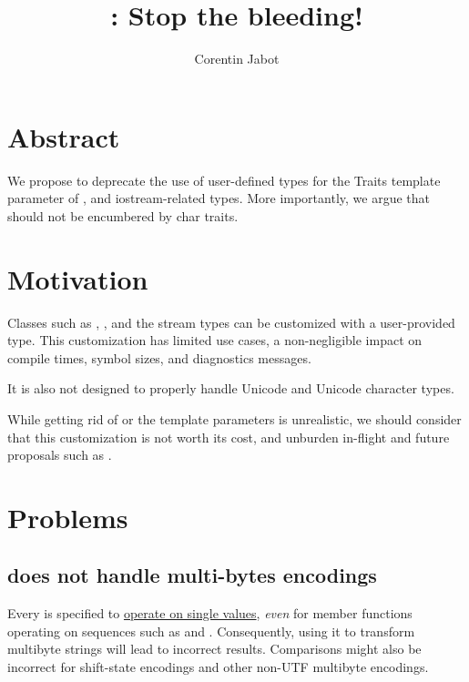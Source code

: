 \documentclass{wg21}
\title{\tcode{char\_traits}: Stop the bleeding!}
\author{Corentin Jabot}{corentin.jabot@gmail.com}
\begin{document}
\maketitle

\section{Abstract}

We propose to deprecate the use of user-defined types for the Traits template parameter of ,  
and iostream-related types. More importantly, we argue that  should not be encumbered by char traits.


\section{Motivation}

Classes such as , , and the stream types can be customized with a user-provided  type.
This customization has limited use cases, a non-negligible impact on compile times, symbol sizes, and diagnostics messages.

It is also not designed to properly handle Unicode and Unicode character types.

While getting rid of  or the  template parameters is unrealistic, we should consider that this customization
is not worth its cost, and unburden in-flight and future proposals such as  .

\section{Problems}

\subsection{ does not handle multi-bytes encodings}

Every   is specified to \href{https://eel.is/c++draft/strings#tab:char.traits.req}{operate on single values}, \emph{even} for member functions operating on
sequences such as  and .
Consequently, using it to transform multibyte strings will lead to incorrect results.
Comparisons might also be incorrect for shift-state encodings and other non-UTF multibyte encodings.
\end{document}
